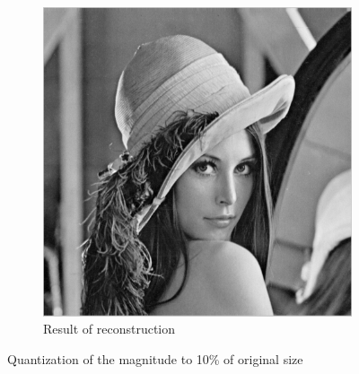 \documentclass[a4paper, 10pt, conference] {article}
\begin{document}
\begin{figure}[H]
\begin{subfigure}{0.32\textwidth}
  		\includegraphics[scale=0.336]{reportImages/exp3_lena_magnitude_compressed01.PNG}
  		\caption{Result of reconstruction}
  	\end{subfigure}
  	\caption{Quantization of the magnitude to 10\% of original size}
  	\label{exp3_mag}
  \end{figure}
  
\end{document}
